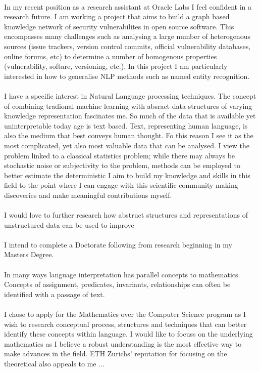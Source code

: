 \\
In my recent position as a research assistant at Oracle Labs I feel confident in a research future. I am working a project that aims to build a graph based knowledge network of security vulnerabilites in open source software. This encompasses many challenges such as analysing a large number of heterogenous sources (issue trackers, version control commits, official vulnerability databases, online forums, etc) to determine a number of homogenous properties (vulnerability, softare, versioning, etc.). In this project I am particularly interested in how to generalise NLP methods such as named entity recognition.\\
\\
I have a specific interest in Natural Language processing techniques. The concept of combining tradional machine learning with absract data structures of varying knowledge representation fascinates me. So much of the data that is available yet uninterpretable today age is text based. Text, representing human language, is also the medium that best conveys human thought. Fo this reason I see it as the most complicated, yet also most valuable data that can be analysed. I view the problem linked to a classical statistics problem; while there may always be stochastic noise or subjectivity to the problem, methods can be employed to better estimate the deterministic  I aim to build my knowledge and skills in this field to the point where I can engage with this scientific community making discoveries and make meaningful contributions myself.\\
\\
I would love to further research how abstruct structures and representations of unstructured data can be used to improve \\
\\
I intend to complete a Doctorate following from research beginning in my Masters Degree.\\
\\
In many ways language interpretation has parallel concepts to mathematics. Concepts of assignment, predicates, invariants, relationships can often be identified with a passage of text.\\
\\
I chose to apply for the Mathematics over the Computer Science program as I wish to research conceptual process, structures and techniques that can better identify these concepts within language. I would like to focuss on the underlying mathematics as I believe a robust understanding is the most effective way to make advances in the field. ETH Zurichs' reputation for focusing on the theoretical also appeals to me ...